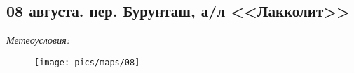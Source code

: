 \subsection{08 августа. пер. Бурунташ, а/л <<Лакколит>>}
\textit{Метеоусловия: }

\begin{figure}[h!]
	\centering
	\texttt{[image: pics/maps/08]}
	\label{fig:08}
\end{figure}



\clearpage